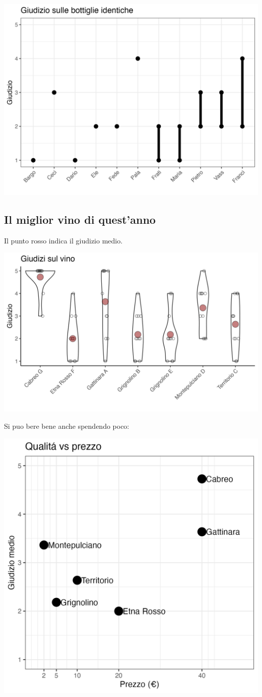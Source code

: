 \documentclass[
]{article}
\begin{document}
\includegraphics[width=1\linewidth]{plots/paired_wines_rating}

\hypertarget{il-miglior-vino-di-questanno}{%
\subsection{Il miglior vino di
quest'anno}\label{il-miglior-vino-di-questanno}}

Il punto rosso indica il giudizio medio.

\includegraphics[width=1\linewidth]{plots/vino_rating_bottle}

Si puo bere bene anche spendendo poco:

\includegraphics[width=0.5\linewidth]{plots/convenienza}
\end{document}
